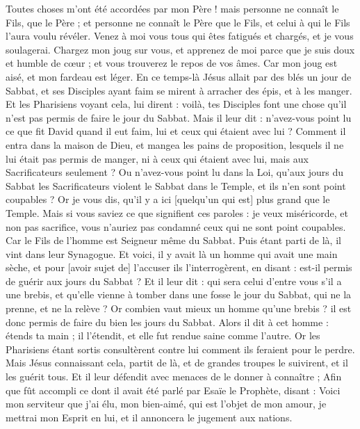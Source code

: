 \begin{multicols}{2}
Toutes choses m'ont été accordées par mon Père ! mais personne ne connaît le Fils, que le Père ; et personne ne connaît le Père que le Fils, et celui à qui le Fils l'aura voulu révéler.
Venez à moi vous tous qui êtes fatigués et chargés, et je vous soulagerai.
Chargez mon joug sur vous, et apprenez de moi parce que je suis doux et humble de cœur ; et vous trouverez le repos de vos âmes.
Car mon joug est aisé, et mon fardeau est léger.
\VerseOne{}En ce temps-là Jésus allait par des blés un jour de Sabbat, et ses Disciples ayant faim se mirent à arracher des épis, et à les manger.
Et les Pharisiens voyant cela, lui dirent : voilà, tes Disciples font une chose qu'il n'est pas permis de faire le jour du Sabbat.
Mais il leur dit : n'avez-vous point lu ce que fit David quand il eut faim, lui et ceux qui étaient avec lui ?
Comment il entra dans la maison de Dieu, et mangea les pains de proposition, lesquels il ne lui était pas permis de manger, ni à ceux qui étaient avec lui, mais aux Sacrificateurs seulement ?
Ou n'avez-vous point lu dans la Loi, qu'aux jours du Sabbat les Sacrificateurs violent le Sabbat dans le Temple, et ils n'en sont point coupables ?
Or je vous dis, qu'il y a ici [quelqu'un qui est] plus grand que le Temple.
Mais si vous saviez ce que signifient ces paroles : je veux miséricorde, et non pas sacrifice, vous n'auriez pas condamné ceux qui ne sont point coupables.
Car le Fils de l'homme est Seigneur même du Sabbat.
Puis étant parti de là, il vint dans leur Synagogue.
Et voici, il y avait là un homme qui avait une main sèche, et pour [avoir sujet de] l'accuser ils l'interrogèrent, en disant : est-il permis de guérir aux jours du Sabbat ?
Et il leur dit : qui sera celui d'entre vous s'il a une brebis, et qu'elle vienne à tomber dans une fosse le jour du Sabbat, qui ne la prenne, et ne la relève ?
Or combien vaut mieux un homme qu'une brebis ? il est donc permis de faire du bien les jours du Sabbat.
Alors il dit à cet homme : étends ta main ; il l'étendit, et elle fut rendue saine comme l'autre.
Or les Pharisiens étant sortis consultèrent contre lui comment ils feraient pour le perdre.
Mais Jésus connaissant cela, partit de là, et de grandes troupes le suivirent, et il les guérit tous.
Et il leur défendit avec menaces de le donner à connaître ;
Afin que fût accompli ce dont il avait été parlé par Esaïe le Prophète, disant :
Voici mon serviteur que j'ai élu, mon bien-aimé, qui est l'objet de mon amour, je mettrai mon Esprit en lui, et il annoncera le jugement aux nations.

\end{multicols}
